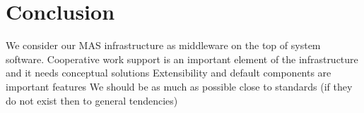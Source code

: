 \section{Conclusion}
We consider our MAS infrastructure as middleware on the top of system software.
Cooperative work support is an important element of the infrastructure and it needs conceptual solutions
Extensibility and default components are important features
We should be as much as possible close to standards (if they do not exist then to general tendencies)